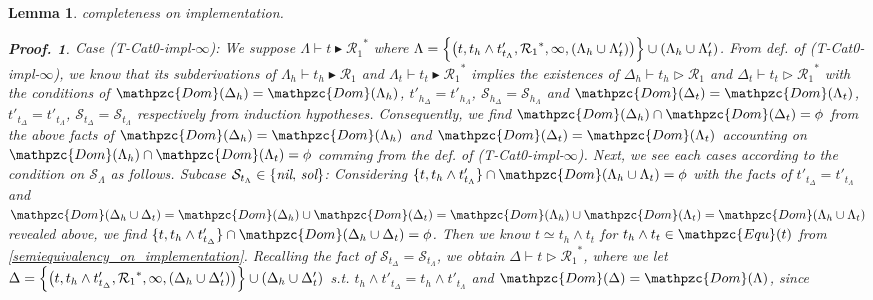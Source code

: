 \documentclass[12pt]{article}
\newtheorem{Lemma}{Lemma}[section]
\newtheorem{Proof}{Proof.}
\begin{document}
\begin{Lemma}{completeness on implementation.}
\begin{Proof}
    Case (T-Cat0-impl-$\infty$): We suppose
    $\Lambda \vdash t \blacktriangleright {\mathcal{R}_1}^*$ where
    $\Lambda = \Bigl\{\bigl(t, t_h \wedge t'_{t_\Lambda},
    {\mathcal{R}_1}^*, \infty, (\Lambda_h \cup \Lambda'_t) \bigr) \Bigr\}
    \cup (\Lambda_h \cup \Lambda'_t)$. From def. of (T-Cat0-impl-$\infty$),
    we know that its subderivations of
    $\Lambda_h \vdash t_h \blacktriangleright \mathcal{R}_1$ and
    $\Lambda_t \vdash t_t \blacktriangleright {\mathcal{R}_1}^*$ implies
    the existences of $\Delta_h \vdash t_h \triangleright \mathcal{R}_1$
    and $\Delta_t \vdash t_t \triangleright {\mathcal{R}_1}^*$ with
    the conditions of
    $\mathpzc{Dom}(\Delta_h) = \mathpzc{Dom}(\Lambda_h)$,
    $t'_{h_\Delta} = t'_{h_\Lambda}$,
    $\mathcal{S}_{h_\Delta} = \mathcal{S}_{h_\Lambda}$ and
    $\mathpzc{Dom}(\Delta_t) = \mathpzc{Dom}(\Lambda_t)$,
    $t'_{t_\Delta} = t'_{t_\Lambda}$,
    $\mathcal{S}_{t_\Delta} = \mathcal{S}_{t_\Lambda}$ respectively
    from induction hypotheses. Consequently, we find
    $\mathpzc{Dom}(\Delta_h) \cap \mathpzc{Dom}(\Delta_t) = \phi$ from
    the above facts of $\mathpzc{Dom}(\Delta_h) = \mathpzc{Dom}(\Lambda_h)$
    and $\mathpzc{Dom}(\Delta_t) = \mathpzc{Dom}(\Lambda_t)$ accounting on
    $\mathpzc{Dom}(\Lambda_h) \cap \mathpzc{Dom}(\Lambda_t) = \phi$ comming
    from the def. of (T-Cat0-impl-$\infty$). Next, we see each cases
    according to the condition on $\mathcal{S}_\Lambda$ as follows.
    Subcase
    $\mathcal{S}_{t_\Lambda} \in \{\text{\it nil},\, \text{\it sol} \}$:
    Considering
    $\{t, t_h \wedge t'_{t_\Lambda} \} \cap \mathpzc{Dom}(\Lambda_h
    \cup \Lambda_t) = \phi$ with the facts of
    $t'_{t_\Delta} = t'_{t_\Lambda}$ and
    $\mathpzc{Dom}(\Delta_h \cup \Delta_t) =
    \mathpzc{Dom}(\Delta_h) \cup \mathpzc{Dom}(\Delta_t) =
    \mathpzc{Dom}(\Lambda_h) \cup \mathpzc{Dom}(\Lambda_t) =
    \mathpzc{Dom}(\Lambda_h \cup \Lambda_t)$ revealed above,
    we find $\{t, t_h \wedge t'_{t_\Delta} \} \cap \mathpzc{Dom}(\Delta_h   
    \cup \Delta_t) = \phi$. Then we know $t \simeq t_h \wedge t_t$ for
    $t_h \wedge t_t \in \mathpzc{Equ}(t)$ from
    \ref{semiequivalency_on_implementation}. Recalling the fact of
    $\mathcal{S}_{t_\Delta} = \mathcal{S}_{t_\Lambda}$, we obtain
    $\Delta \vdash t \triangleright {\mathcal{R}_1}^*$,
    where we let $\Delta = \Bigl\{\bigl(t, t_h \wedge t'_{t_\Delta},
    {\mathcal{R}_1}^*, \infty, (\Delta_h \cup \Delta'_t) \bigr)\Bigr\}
    \cup (\Delta_h \cup \Delta'_t)$ s.t.
    $t_h \wedge t'_{t_\Delta} = t_h \wedge t'_{t_\Lambda}$ and
    $\mathpzc{Dom}(\Delta) = \mathpzc{Dom}(\Lambda)$, since

\end{Proof}
\end{Lemma}
\end{document}
